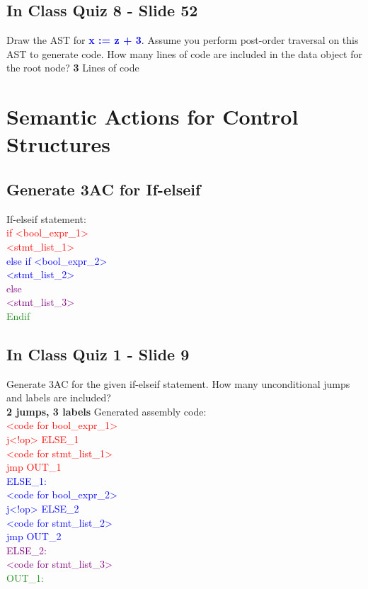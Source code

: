 \documentclass{report}
\newcommand{\textb}[1]{\textcolor{blue}{#1}}
\newcommand{\textg}[1]{\textcolor{ForestGreen}{#1}}
\newcommand{\textp}[1]{\textcolor{purple}{#1}}
\newcommand{\textr}[1]{\textcolor{red}{#1}}
\newcommand{\textbfb}[1]{\textbf{\textb{#1}}}
\newlength\tindent
\renewcommand{\indent}{\hspace*{\tindent}}
\begin{document}
\section{In Class Quiz 8 - Slide 52}
Draw the AST for \textbfb{x := z + 3}. Assume you perform post-order traversal
on this AST to generate code. How many lines of code are included in
the data object for the root node? \textbf{3} Lines of code


\chapter{Semantic Actions for Control Structures}
\section{Generate 3AC for If-elseif}
\vspace{-1em}
\begin{multicols}{2}
If-elseif statement: \\
\textr{if <bool\_expr\_1>} \\
\indent \textr{<stmt\_list\_1>} \\
\textb{else if <bool\_expr\_2>} \\
\indent \textb{<stmt\_list\_2>} \\
\textp{else} \\
\indent \textp{<stmt\_list\_3>} \\
\textg{Endif}
\section{In Class Quiz 1 - Slide 9}
\vspace{.5em}
Generate 3AC for the given if-elseif statement.
How many unconditional jumps and labels are included? \\
\textbf{2 jumps, 3 labels}
  \vfill\columnbreak
Generated assembly code: \\
\indent \textr{<code for bool\_expr\_1>} \\
\indent \textr{j<!op> ELSE\_1} \\
\indent \textr{<code for stmt\_list\_1>} \\
\indent \textr{jmp OUT\_1} \\
\textb{ELSE\_1:} \\
\indent \textb{<code for bool\_expr\_2>} \\
\indent \textb{j<!op> ELSE\_2} \\
\indent \textb{<code for stmt\_list\_2>} \\
\indent \textb{jmp OUT\_2} \\
\textp{ELSE\_2:} \\
\indent \textp{<code for stmt\_list\_3>} \\
\textg{OUT\_1:}
\end{multicols}
\end{document}
